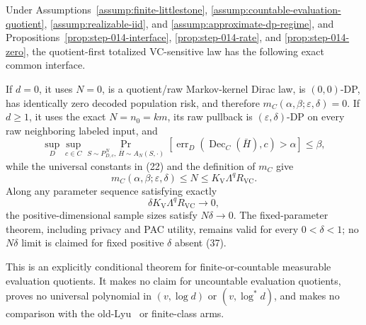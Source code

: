 \begin{proposition}\label{prop:step-014-vc-arm}
Under Assumptions~\ref{assump:finite-littlestone},
\ref{assump:countable-evaluation-quotient},
\ref{assump:realizable-iid}, and
\ref{assump:approximate-dp-regime}, and
Propositions~\ref{prop:step-014-interface},
\ref{prop:step-014-rate}, and
\ref{prop:step-014-zero}, the quotient-first totalized VC-sensitive law has
the following exact common interface.

If \(d=0\), it uses \(N=0\), is a quotient/raw Markov-kernel Dirac law, is
\((0,0)\)-DP, has identically zero decoded population risk, and therefore
\(m_C(\alpha,\beta;\varepsilon,\delta)=0\). If
\(d\geq1\), it uses the exact  \(N=n_0=km\), its raw pullback is
\((\varepsilon,\delta)\)-DP on every raw neighboring labeled input, and
\[
\sup_D\sup_{c\in C}
\Pr_{S\sim P_{D,c}^N,\,\bar H\sim A_N(S,\cdot)}
\left[
\operatorname{err}_D(\operatorname{Dec}_C(\bar H),c)>\alpha
\right]
\leq\beta,
\tag{35}
\]
while the universal constants in (22) and the definition of \(m_C\) give
\[
 m_C(\alpha,\beta;\varepsilon,\delta)
 \leq N\leq K_{\mathrm V}\Lambda^qR_{\mathrm{VC}}.
\tag{36}
\]
Along any parameter sequence satisfying exactly
\[
 \delta K_{\mathrm V}\Lambda^qR_{\mathrm{VC}}\longrightarrow0,
\tag{37}
\]
the positive-dimensional sample sizes satisfy \(N\delta\to0\). The
fixed-parameter theorem, including privacy and PAC utility, remains valid
for every \(0<\delta<1\); no \(N\delta\) limit is claimed for fixed positive
\(\delta\) absent (37).

This is an explicitly conditional theorem for finite-or-countable
measurable evaluation quotients. It makes no claim for uncountable
evaluation quotients, proves no universal polynomial in
\((v,\log d)\) or \((v,\log^*d)\), and makes no comparison with the old-Lyu~\citep{lyu2025}
or finite-class arms.


\end{proposition}

